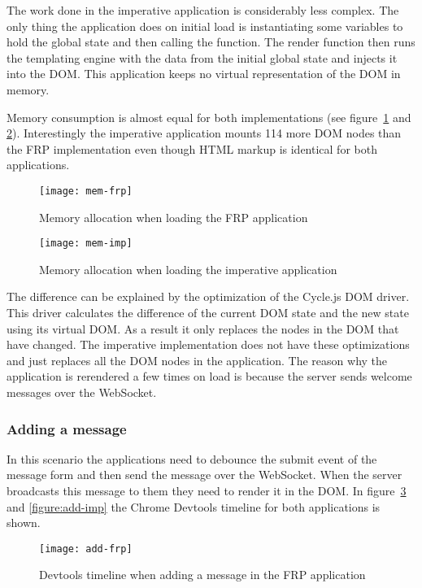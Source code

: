 The work done in the imperative application is considerably less complex. The only thing the application does on initial load is instantiating some variables to hold the global state and then calling the  function. The render function then runs the templating engine with the data from the initial global state and injects it into the DOM. This application keeps no virtual representation of the DOM in memory.

Memory consumption is almost equal for both implementations (see figure~\ref{figure:mem-frp} and \ref{figure:mem-imp}). Interestingly the imperative application mounts 114 more DOM nodes than the FRP implementation even though HTML markup is identical for both applications.

\begin{figure}[H]
	\centering
	\texttt{[image: mem-frp]}
	\caption{Memory allocation when loading the FRP application}
	\label{figure:mem-frp}
\end{figure}

\begin{figure}[H]
	\centering
	\texttt{[image: mem-imp]}
	\caption{Memory allocation when loading the imperative application}
	\label{figure:mem-imp}
\end{figure}

The difference can be explained by the optimization of the Cycle.js DOM driver. This driver calculates the difference of the current DOM state and the new state using its virtual DOM. As a result it only replaces the nodes in the DOM that have changed. The imperative implementation does not have these optimizations and just replaces all the DOM nodes in the application. The reason why the application is rerendered a few times on load is because the server sends welcome messages over the WebSocket.

\subsubsection{Adding a message}

In this scenario the applications need to debounce the submit event of the message form and then send the message over the WebSocket. When the server broadcasts this message to them they need to render it in the DOM. In figure~\ref{figure:add-frp} and \ref{figure:add-imp} the Chrome Devtools timeline for both applications is shown.

\begin{figure}[H]
	\centering
	\texttt{[image: add-frp]}
	\caption{Devtools timeline when adding a message in the FRP application}
	\label{figure:add-frp}
\end{figure}

